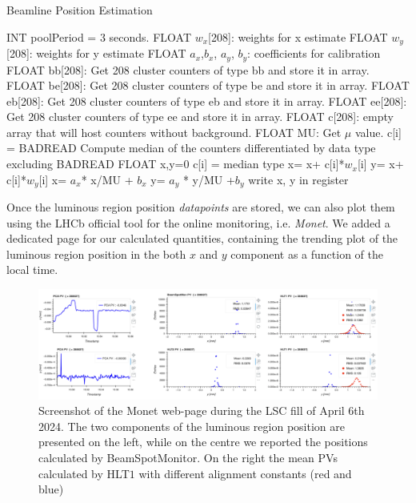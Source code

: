 \begin{algorithm}
\caption{Beamline Position Estimation}\label{alg:beamline}
\begin{algorithmic}[1]
\ENSURE  INT poolPeriod = 3 seconds.
\ENSURE  FLOAT $w_x$[208]: weights for x estimate
\ENSURE  FLOAT $w_y$[208]: weights for y estimate
\ENSURE  FLOAT $a_x$,$ b_x$, $a_y$, $b_y$: coefficients for calibration 
        \STATE FLOAT  bb[208]: Get 208 cluster counters of type bb and store it in array.
        \STATE FLOAT  be[208]: Get 208 cluster counters of type be and store it in array.
        \STATE FLOAT  eb[208]: Get 208 cluster counters of type eb and store it in array.
        \STATE FLOAT  ee[208]: Get 208 cluster counters of type ee and store it in array.
        \STATE FLOAT c[208]: empty array that will host counters without background.
        \STATE FLOAT MU: Get $\mu$ value.
        \ELSE
        \STATE c[i] = BADREAD
        \ENDIF
        \ENDFOR
        \STATE Compute median of the counters differentiated by data type excluding BADREAD 
        \STATE FLOAT x,y=0
            \STATE c[i] = median type 
        \ENDIF
        \STATE x= x+ c[i]*$w_x$[i]
        \STATE y= x+ c[i]*$w_y$[i]
        \ENDFOR
        \STATE x= $a_x$* x/MU + $b_x$
        \STATE y= $a_y$ * y/MU +$b_y$
        \STATE write x, y in register
        \ENDIF
    \ENDIF
\ENDWHILE
\end{algorithmic}
\end{algorithm}


Once the luminous region position \textit{datapoints} are stored, we can also plot them using the LHCb official tool for the online monitoring, i.e. \textit{Monet}. We added a dedicated page for our calculated quantities, containing the trending plot of the luminous region position in the both $x$ and $y$ component as a function of the local time.

\begin{figure}
    \centering
    \includegraphics[width=\textwidth]{figures/Monet_beamline_screen.png}
    \caption{Screenshot of the Monet web-page during the LSC fill of April 6th 2024. The two components of the luminous region position are presented on the left, while on the centre we reported the positions calculated by BeamSpotMonitor. On the right the mean PVs calculated by HLT$1$ with different alignment constants (red and blue)}
    \label{fig:monet_beamline}
\end{figure}

